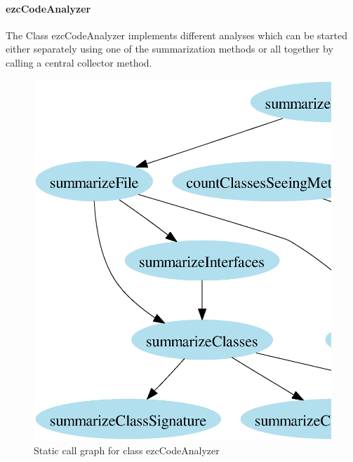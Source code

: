 \documentclass[10pt,final,a4paper,oneside]{article}
\begin{document}
\paragraph{ezcCodeAnalyzer}
The Class ezcCodeAnalyzer
implements different analyses which can be started either
separately using one of the summarization methods
or all together by calling a central collector method.

\begin{figure}[htbp]
	\centering
		\includegraphics[width=1.00\textwidth]{figures/callgraph-code_analyzer.ps}
	\caption{Static call graph for class ezcCodeAnalyzer}
	\label{fig:callgraph-code_analyzer}
\end{figure}
\end{document}
